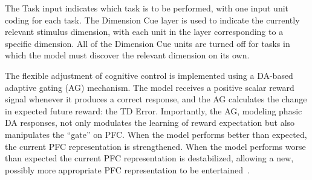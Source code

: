 The Task input indicates which task is to be performed, with one input unit coding for each task. The Dimension Cue layer is used to indicate the currently relevant stimulus dimension, with each unit in the layer corresponding to a specific dimension. All of the Dimension Cue units are turned off for tasks in which the model must discover the relevant dimension on its own.

The flexible adjustment of cognitive control is implemented using a DA-based adaptive gating (AG) mechanism. The model receives a positive scalar reward signal whenever it produces a correct response, and the AG calculates the change in expected future reward: the TD Error. Importantly, the AG, modeling phasic DA responses, not only modulates the learning of reward expectation but also manipulates the ``gate'' on PFC. When the model performs better than expected, the current PFC representation is strengthened. When the model performs worse than expected the current PFC representation is destabilized, allowing a new, possibly more appropriate PFC representation to be entertained~\cite{RougierNP:2005:XT}.



